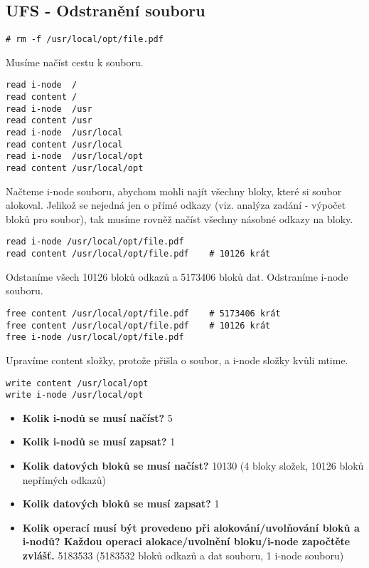 \subsection{UFS - Odstranění souboru}

\begin{verbatim}
# rm -f /usr/local/opt/file.pdf
\end{verbatim}

Musíme načíst cestu k souboru.

\begin{verbatim}
read i-node  /
read content /
read i-node  /usr
read content /usr
read i-node  /usr/local
read content /usr/local
read i-node  /usr/local/opt
read content /usr/local/opt
\end{verbatim}

Načteme i-node souboru, abychom mohli najít všechny bloky, které si soubor alokoval. Jelikož se nejedná jen o přímé odkazy (viz. analýza zadání - výpočet bloků pro soubor), tak musíme rovněž načíst všechny násobné odkazy na bloky.
\begin{verbatim}
read i-node /usr/local/opt/file.pdf
read content /usr/local/opt/file.pdf    # 10126 krát
\end{verbatim}

Odstaníme všech 10126 bloků odkazů a 5173406 bloků dat. Odstraníme i-node souboru.
\begin{verbatim}
free content /usr/local/opt/file.pdf    # 5173406 krát
free content /usr/local/opt/file.pdf    # 10126 krát
free i-node /usr/local/opt/file.pdf
\end{verbatim}

Upravíme content složky, protože přišla o soubor, a i-node složky kvůli mtime.
\begin{verbatim}
write content /usr/local/opt
write i-node /usr/local/opt
\end{verbatim}

\begin{itemize}
    \item \textbf{Kolik i-nodů se musí načíst?} 5
    \item \textbf{Kolik i-nodů se musí zapsat?} 1
    \item \textbf{Kolik datových bloků se musí načíst?} 10130
    (4 bloky složek, 10126 bloků nepřímých odkazů)
    \item \textbf{Kolik datových bloků se musí zapsat?} 1
    \item \textbf{Kolik operací musí být provedeno při alokování/uvolňování bloků a i-nodů? Každou operaci alokace/uvolnění bloku/i-node započtěte zvlášť.} 5183533
    (5183532 bloků odkazů a dat souboru, 1 i-node souboru)
\end{itemize}
